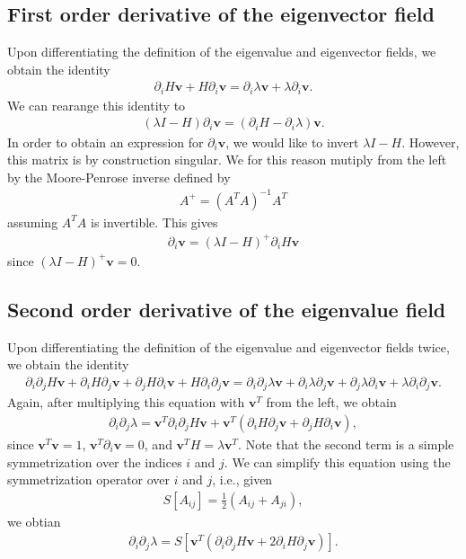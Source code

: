 \documentclass{article}
\begin{document}
\subsection{First order derivative of the eigenvector field}
Upon differentiating the definition of the eigenvalue and eigenvector fields, we obtain the identity 
\begin{align}
\partial_i H \bm{v} + H \partial_i \bm{v} = \partial_i \lambda \bm{v} + \lambda \partial_i \bm{v}.
\end{align}
We can rearange this identity to 
\begin{align}
(\lambda I - H) \partial_i \bm{v} = (\partial_i H - \partial_i \lambda )\bm{v}.
\end{align}
In order to obtain an expression for $\partial_i \bm{v}$, we would like to invert $\lambda I - H$. However, this matrix is by construction singular. We for this reason mutiply from the left by the Moore-Penrose inverse defined by
\begin{align}
A^+ = (A^T A)^{-1}A^T
\end{align}
assuming $A^T A$ is invertible. This gives
\begin{align}
\partial_i \bm{v} = (\lambda I - H)^+ \partial_i H \bm{v}
\end{align}
since $(\lambda I - H)^+ \bm{v}=0$.

\subsection{Second order derivative of the eigenvalue field}
Upon differentiating the definition of the eigenvalue and eigenvector fields twice, we obtain the identity 
\begin{align}
\partial_i \partial_j H \bm{v} + \partial_i H \partial_j \bm{v} + \partial_j H \partial_i \bm{v} + H \partial_i \partial_j \bm{v}
= \partial_i \partial_j \lambda \bm{v} + \partial_i \lambda \partial_j \bm{v}+ \partial_j \lambda \partial_i \bm{v} + \lambda \partial_i \partial_j \bm{v}.
\end{align}
Again, after multiplying this equation with $\bm{v}^T$ from the left, we obtain
\begin{align}
\partial_i \partial_j \lambda 
=
\bm{v}^T\partial_i \partial_j H \bm{v} + \bm{v}^T (\partial_i H \partial_j \bm{v} + \partial_j H \partial_i \bm{v} ),
\end{align}
since $\bm{v}^T\bm{v}=1$, $\bm{v}^T \partial_i \bm{v}=0$, and $\bm{v}^TH=\lambda \bm{v}^T$. Note that the second term is a simple symmetrization over the indices $i$ and $j$. We can simplify this equation using the symmetrization operator over $i$ and $j$, i.e., given
\begin{align}
S[A_{ij}]=\frac{1}{2}(A_{ij}+A_{ji}),
\end{align}
we obtian
\begin{align}
\partial_i \partial_j \lambda = S[\bm{v}^T (\partial_i \partial_j H \bm{v} + 2 \partial_i H \partial_j \bm{v})].
\end{align}
\end{document}

